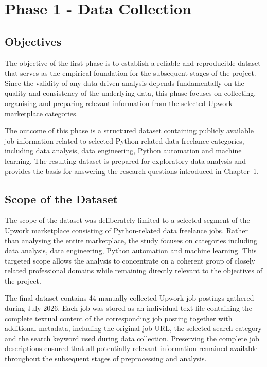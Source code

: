 
\chapter{Phase 1 - Data Collection}

\section{Objectives}

The objective of the first phase is to establish a reliable and reproducible dataset that serves as the empirical foundation for the subsequent
stages of the project. Since the validity of any data-driven analysis depends fundamentally on the quality and consistency of the underlying data,
this phase focuses on collecting, organising and preparing relevant information from the selected Upwork marketplace categories.

The outcome of this phase is a structured dataset containing publicly available job information related to selected
Python-related data freelance categories, including data analysis, data engineering, Python automation and machine learning.
The resulting dataset is prepared for exploratory data analysis and provides the basis for answering the research questions
introduced in Chapter~1.

\section{Scope of the Dataset}

The scope of the dataset was deliberately limited to a selected segment of the Upwork marketplace consisting of Python-related data freelance
jobs. Rather than analysing the entire marketplace, the study focuses on categories including data analysis, data engineering,
Python automation and machine learning. This targeted scope allows the analysis to concentrate on a coherent group of closely related professional
domains while remaining directly relevant to the objectives of the project.

The final dataset contains 44 manually collected Upwork job postings gathered during July 2026. Each job was stored as an individual
text file containing the complete textual content of the corresponding job posting together with additional metadata, including the original job URL,
the selected search category and the search keyword used during data collection. Preserving the complete job descriptions ensured that
all potentially relevant information remained available throughout the subsequent stages of preprocessing and analysis.

